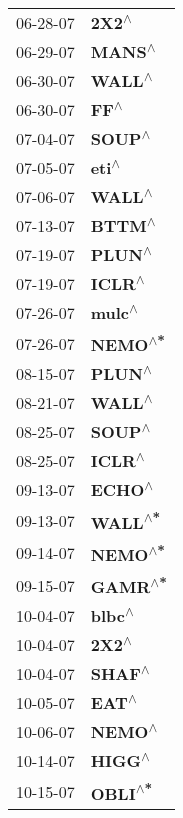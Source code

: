 \begin{supertabular}{p{0.08\textwidth}p{0.2\textwidth}}
 06-28-07 &     \textbf{2X2\textsuperscript{$\wedge$}} \\
 06-29-07 &    \textbf{MANS\textsuperscript{$\wedge$}} \\
 06-30-07 &    \textbf{WALL\textsuperscript{$\wedge$}} \\
 06-30-07 &      \textbf{FF\textsuperscript{$\wedge$}} \\
 07-04-07 &    \textbf{SOUP\textsuperscript{$\wedge$}} \\
 07-05-07 &     \textbf{eti\textsuperscript{$\wedge$}} \\
 07-06-07 &    \textbf{WALL\textsuperscript{$\wedge$}} \\
 07-13-07 &    \textbf{BTTM\textsuperscript{$\wedge$}} \\
 07-19-07 &    \textbf{PLUN\textsuperscript{$\wedge$}} \\
 07-19-07 &    \textbf{ICLR\textsuperscript{$\wedge$}} \\
 07-26-07 &    \textbf{mulc\textsuperscript{$\wedge$}} \\
 07-26-07 &   \textbf{NEMO\textsuperscript{$\wedge$*}} \\
 08-15-07 &    \textbf{PLUN\textsuperscript{$\wedge$}} \\
 08-21-07 &    \textbf{WALL\textsuperscript{$\wedge$}} \\
 08-25-07 &    \textbf{SOUP\textsuperscript{$\wedge$}} \\
 08-25-07 &    \textbf{ICLR\textsuperscript{$\wedge$}} \\
 09-13-07 &    \textbf{ECHO\textsuperscript{$\wedge$}} \\
 09-13-07 &   \textbf{WALL\textsuperscript{$\wedge$*}} \\
 09-14-07 &   \textbf{NEMO\textsuperscript{$\wedge$*}} \\
 09-15-07 &   \textbf{GAMR\textsuperscript{$\wedge$*}} \\
 10-04-07 &    \textbf{blbc\textsuperscript{$\wedge$}} \\
 10-04-07 &     \textbf{2X2\textsuperscript{$\wedge$}} \\
 10-04-07 &    \textbf{SHAF\textsuperscript{$\wedge$}} \\
 10-05-07 &     \textbf{EAT\textsuperscript{$\wedge$}} \\
 10-06-07 &    \textbf{NEMO\textsuperscript{$\wedge$}} \\
 10-14-07 &    \textbf{HIGG\textsuperscript{$\wedge$}} \\
 10-15-07 &   \textbf{OBLI\textsuperscript{$\wedge$*}} \\

\end{supertabular}
